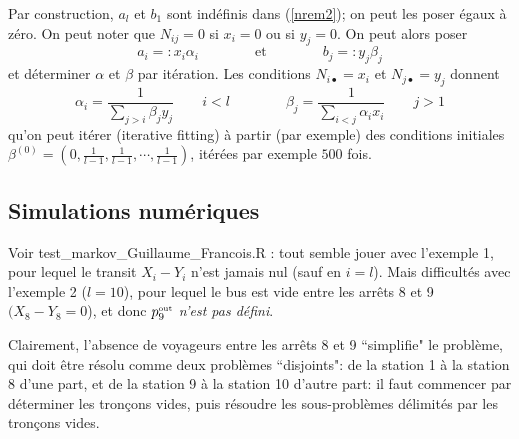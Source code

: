 \documentclass{svmult}
\begin{document}
 Par construction, $a_l$ et $b_1$ sont indéfinis dans  (\ref{nrem2}); on peut les poser égaux à zéro. On peut noter que 
 $N_{ij}=0$ si $x_i=0$ ou si $y_j=0$.  On peut alors poser 
 \begin{displaymath}
a_i=:x_i\alpha_i\qquad\qquad\mbox{et}\qquad\qquad b_j=:y_j\beta_j
\end{displaymath}
et déterminer $\alpha$ et $\beta$ par itération. Les conditions $N_{i\bullet}=x_i$ et $N_{j\bullet}=y_j$ donnent 
\begin{equation}
\label{iterFit}
\alpha_i=\frac{1}{\sum_{j>i}\beta_j y_j}\qquad i<l \qquad\qquad \beta_j =\frac{1}{\sum_{i<j}\alpha_i x_i}\qquad j>1
\end{equation}
qu'on peut itérer (iterative fitting) à partir (par exemple) des conditions initiales $\beta^{(0)}=(0,\frac{1}{l-1},\frac{1}{l-1},\cdots,\frac{1}{l-1})$, itérées par exemple $500$ fois. 


\subsection{Simulations numériques}
 Voir test\_markov\_Guillaume\_Francois.R : tout semble jouer avec l'exemple 1, pour lequel le transit $X_i-Y_i$ n'est jamais nul (sauf en $i=l$). Mais difficultés avec l'exemple 2 ($l=10$), pour lequel le bus est vide entre les arrêts 8 et 9 $(X_8-Y_8=0$), et donc  $p_9^{\mbox{\tiny out}}$ {\em n'est pas défini}.
 
 Clairement, l'absence de voyageurs entre les arrêts 8 et 9 ``simplifie" le problème, qui doit être résolu comme deux problèmes ``disjoints": de la station 1 à la station 8 d'une part, et de la station 9 à la station 10 d'autre part: il faut commencer par déterminer les tronçons vides, puis résoudre les sous-problèmes délimités par les tronçons vides. 
 
\end{document}
